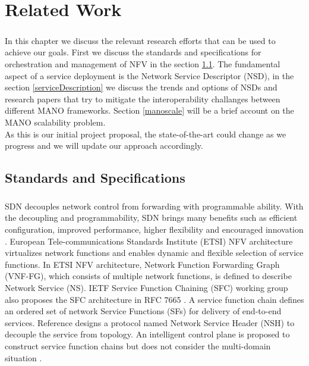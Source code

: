 \chapter{Related Work}
\label{ch:Related Work}

\paragraph{}
In this chapter we discuss the relevant research efforts that can be used to achieve our goals. First we discuss the standards and specifications for orchestration and management of NFV in the section \ref{standSpecs}. The fundamental aspect of a service deployment is the Network Service Descriptor (NSD), in the section \ref{serviceDescription} we discuss the trends and options of NSDs and research papers that try to mitigate the interoperability challanges between different MANO frameworks. Section \ref{manoscale} will be a brief account on the MANO scalability problem.\\

As this is our initial project proposal, the state-of-the-art could change as we progress and we will update our approach accordingly.


\section{Standards and Specifications}
\label{standSpecs}
\paragraph{}
SDN decouples network control from forwarding with programmable ability. With the decoupling and programmability, SDN brings many benefits such as efficient configuration, improved performance, higher flexibility and encouraged innovation \cite{xia2015survey}. European Tele-communications Standards Institute (ETSI) NFV \cite{nfv2network} architecture virtualizes network functions and enables dynamic and flexible selection of service functions. In ETSI NFV architecture, Network Function Forwarding Graph (VNF-FG), which consists of multiple network functions, is defined to describe Network Service (NS). IETF Service Function Chaining (SFC) working group also proposes the SFC architecture in RFC 7665 \cite{halpern2015service}. A service function chain defines an ordered set of network Service Functions (SFs) for delivery of end-to-end services. Reference \cite{quinn2016network} designs a protocol named Network Service Header (NSH) to decouple the service from topology. An intelligent control plane is proposed to construct service function chains but does not consider the multi-domain situation \cite{boucadair2016service}.\\

